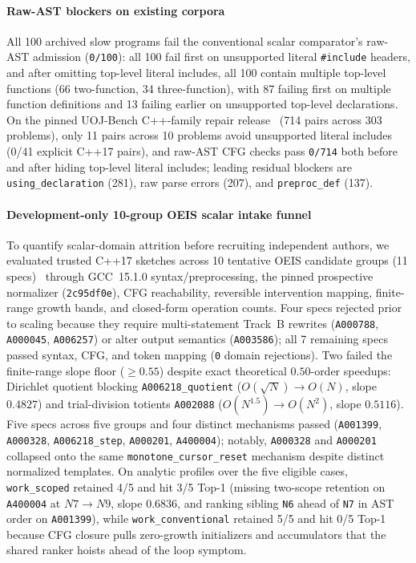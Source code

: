 \paragraph{Raw-AST blockers on existing corpora}
All 100 archived slow programs fail the conventional scalar comparator's raw-AST admission (\texttt{0/100}): all 100 fail first on unsupported literal \texttt{\#include} headers, and after omitting top-level literal includes, all 100 contain multiple top-level functions (66 two-function, 34 three-function), with 87 failing first on multiple function definitions and 13 failing earlier on unsupported top-level declarations. On the pinned UOJ-Bench C++-family repair release~\cite{xu2026uoj} (714 pairs across 303 problems), only 11 pairs across 10 problems avoid unsupported literal includes (0/41 explicit C++17 pairs), and raw-AST CFG checks pass \texttt{0/714} both before and after hiding top-level literal includes; leading residual blockers are \texttt{using\_declaration} (281), raw parse errors (207), and \texttt{preproc\_def} (137).

\paragraph{Development-only 10-group OEIS scalar intake funnel}
To quantify scalar-domain attrition before recruiting independent authors, we evaluated trusted C++17 sketches across 10 tentative OEIS candidate groups (11 specs)~\cite{oeis2026} through GCC~15.1.0 syntax/preprocessing, the pinned prospective normalizer (\texttt{2c95df0e}), CFG reachability, reversible intervention mapping, finite-range growth bands, and closed-form operation counts. Four specs rejected prior to scaling because they require multi-statement Track~B rewrites (\texttt{A000788}, \texttt{A000045}, \texttt{A006257}) or alter output semantics (\texttt{A003586}); all 7 remaining specs passed syntax, CFG, and token mapping (\texttt{0} domain rejections). Two failed the finite-range slope floor ($\ge 0.55$) despite exact theoretical $0.50$-order speedups: Dirichlet quotient blocking \texttt{A006218\_quotient} ($O(\sqrt{N})\to O(N)$, slope $0.4827$) and trial-division totients \texttt{A002088} ($O(N^{1.5})\to O(N^2)$, slope $0.5116$). Five specs across five groups and four distinct mechanisms passed (\texttt{A001399}, \texttt{A000328}, \texttt{A006218\_step}, \texttt{A000201}, \texttt{A400004}); notably, \texttt{A000328} and \texttt{A000201} collapsed onto the same \texttt{monotone\_cursor\_reset} mechanism despite distinct normalized templates. On analytic profiles over the five eligible cases, \texttt{work\_scoped} retained 4/5 and hit 3/5 Top-1 (missing two-scope retention on \texttt{A400004} at $N7\to N9$, slope $0.6836$, and ranking sibling \texttt{N6} ahead of \texttt{N7} in AST order on \texttt{A001399}), while \texttt{work\_conventional} retained 5/5 and hit 0/5 Top-1 because CFG closure pulls zero-growth initializers and accumulators that the shared ranker hoists ahead of the loop symptom.

